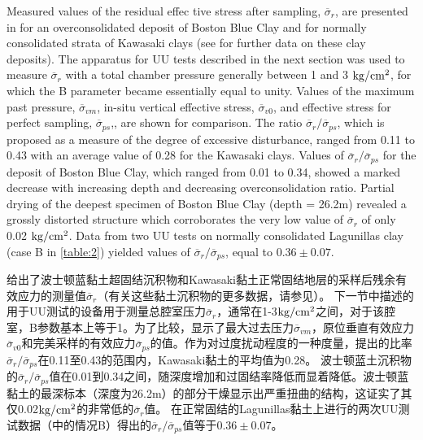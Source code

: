 

\begin{paracol}{2}
    
    Measured values of the residual effec tive stress after sampling, $\overline{\sigma}_r$, are presented in  for an overconsolidated deposit of Boston Blue Clay and for normally consolidated strata of Kawasaki clays (see  for further data on these clay deposits). The apparatus for UU tests described in the next section was used to measure $\overline{\sigma}_r$ with a total chamber pressure generally between 1 and 3 $\rm{kg/cm^2}$, for which the B parameter became essentially equal to unity. Values of the maximum past pressure, $\overline{\sigma}_{vm}$, in-situ vertical effective stress, $\overline{\sigma}_{v0}$, and effective stress for perfect sampling, $\overline{\sigma}_{ps}$,, are shown for comparison. The ratio $\overline{\sigma}_r/\overline{\sigma}_{ps}$, which is proposed as a measure of the degree of excessive disturbance, ranged from 0.11 to 0.43 with an average value of 0.28 for the Kawasaki clays. Values of $\overline{\sigma}_r/\overline{\sigma}_{ps}$ for the deposit of Boston Blue Clay, which ranged from 0.01 to 0.34, showed a marked decrease with increasing depth and decreasing overconsolidation ratio. Partial drying of the deepest specimen of Boston Blue Clay (depth = 26.2m) revealed a grossly distorted structure which corroborates the very low value of $\overline{\sigma}_r$ of only 0.02 $\rm{kg/cm^2}$. Data from two UU tests on normally consolidated Lagunillas clay (case B in \autoref{table:2}) yielded values of $\overline{\sigma}_r/\overline{\sigma}_{ps}$, equal to $0.36\pm{}0.07$.

    \switchcolumn

    给出了波士顿蓝黏土超固结沉积物和Kawasaki黏土正常固结地层的采样后残余有效应力的测量值$\overline{\sigma}_r$（有关这些黏土沉积物的更多数据，请参见）。 下一节中描述的用于UU测试的设备用于测量总腔室压力$\overline{\sigma}_r$，通常在1-3$\rm{kg/cm^2}$之间，对于该腔室，B参数基本上等于1。为了比较，显示了最大过去压力$\overline{\sigma}_{vm}$，原位垂直有效应力$\overline{\sigma}_{v0}$和完美采样的有效应力$\overline{\sigma}_{ps}$的值。作为对过度扰动程度的一种度量，提出的比率$\overline{\sigma}_r/\overline{\sigma}_{ps}$在0.11至0.43的范围内，Kawasaki黏土的平均值为0.28。 波士顿蓝土沉积物的$\overline{\sigma}_r/\overline{\sigma}_{ps}$值在0.01到0.34之间，随深度增加和过固结率降低而显着降低。波士顿蓝黏土的最深标本（深度为26.2m）的部分干燥显示出严重扭曲的结构，这证实了其仅0.02$\rm{kg/cm^2}$的非常低的$\overline{\sigma}_r$值。 在正常固结的Lagunillas黏土上进行的两次UU测试数据（中的情况B）得出的$\overline{\sigma}_r/\overline{\sigma}_{ps}$值等于$0.36\pm{}0.07$。

\end{paracol}

